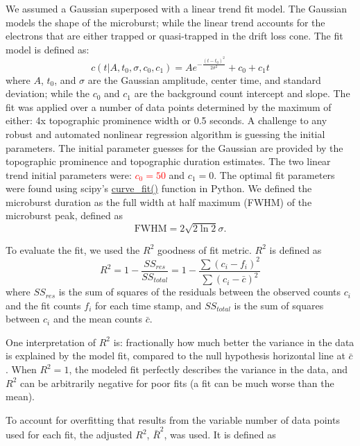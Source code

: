 \documentclass[draft]{agujournal2019}
\begin{document}
We assumed a Gaussian superposed with a linear trend fit model. The Gaussian models the shape of the microburst; while the linear trend accounts for the electrons that are either trapped or quasi-trapped in the drift loss cone. The fit model is defined as:
\begin{equation}
c(t | A, t_0, \sigma, c_0, c_1) = A e^{-\frac{(t-t_0)^2}{2\sigma^2}} + c_0 + c_1 t
\end{equation} where $A$, $t_0$, and $\sigma$ are the Gaussian amplitude, center time, and standard deviation; while the $c_0$ and $c_1$ are the background count intercept and slope. The fit was applied over a number of data points determined by the maximum of either: 4x topographic prominence width or 0.5 seconds. A challenge to any robust and automated nonlinear regression algorithm is guessing the initial parameters. The initial parameter guesses for the Gaussian are provided by the topographic prominence and topographic duration estimates. The two linear trend initial parameters were: \textcolor{red}{$c_0=50$} and $c_1=0$. The optimal fit parameters were found using scipy's \url{curve_fit()} function in Python. We defined the microburst duration as the full width at half maximum (FWHM) of the microburst peak, defined as
\begin{equation}
\mathrm{FWHM} = 2\sqrt{2 \ln{2}} \sigma.
\end{equation}

To evaluate the fit, we used the $R^2$ goodness of fit metric. $R^2$ is defined as
\begin{equation}
R^2 = 1 - \frac{SS_{res}}{SS_{total}} = 1 - \frac{\sum{(c_i-f_i)^2}}{\sum{(c_i-\bar{c})^2}}
\end{equation} where $SS_{res}$ is the sum of squares of the residuals between the observed counts $c_i$ and the fit counts $f_i$ for each time stamp, and $SS_{total}$ is the sum of squares between $c_i$ and the mean counts $\bar{c}$.

One interpretation of $R^2$ is: fractionally how much better the variance in the data is explained by the model fit, compared to the null hypothesis horizontal line at $\bar{c}$. When $R^2=1$, the modeled fit perfectly describes the variance in the data, and $R^2$ can be arbitrarily negative for poor fits (a fit can be much worse than the mean).

To account for overfitting that results from the variable number of data points used for each fit, the adjusted $R^2$, $\bar{R}^2$, was used. It is defined as
\end{document}
